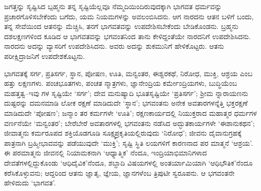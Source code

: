 ಜಗತ್ತನ್ನು ಸೃಷ್ಟಿಸಿದ ಬ್ಪಹ್ಮನು ತನ್ನ ಸೃಷ್ಟಿಯೆಲ್ಲವೂ ನೆಮ್ಮದಿಯಿಂದಿರುವುದಕ್ಕಾಗಿ ಭಾಗವತ ಧರ್ಮವನ್ನು ಪ್ರಚಾರಗೊಳಿಸಬೇಕೆಂದು ಬಗೆದು, ಯಮ ನಿಯಮಗಳನ್ನು ಅವಲಂಬಿಸಿದನು. ಆಗ ನಾರದನು ಆತನ ಬಳಿಗೆ ಬಂದು, ತನ್ನ ಸೇವೆಯಿಂದ ಆತನನ್ನು ಮೆಚ್ಚಿಸಿ, ತನಗೆ ಭಾಗವತವನ್ನು ಉಪದೇಶಿಸಬೇಕೆಂದು ಬೇಡಿಕೊಂಡನು. ಬ್ರಹ್ಮನು ದಶಲಕ್ಷಣಗಳಿಂದ ಕೂಡಿದ ಆ ಭಾಗವತವನ್ನು ಭಗವಂತನಿಂದ ತಾನು ಕೇಳಿದ್ದಂತೆಯೇ ನಾರದನಿಗೆ ಉಪದೇಶಿಸಿದನು. ನಾರದನು ಅದನ್ನು ವ್ಯಾಸರಿಗೆ ಉಪದೇಶಿಸಿದನು. ಅವರು ಅದನ್ನು ಶುಕಮುನಿಗೆ ಹೇಳಿಕೊಟ್ಟರು. ಆತನು ಪರೀಕ್ಷಿದ್ರಾಜನಿಗೆ ಉಪದೇಶಕೊಟ್ಟನು.

ಭಾಗವತಕ್ಕೆ ಸರ್ಗ, ಪ್ರತಿಸರ್ಗ, ಸ್ಥಾನ, ಪೋಷಣ, ಊತಿ, ಮನ್ವಂತರ, ಈಶ್ವರಕಥೆ, ನಿರೋಧ, ಮುಕ್ತಿ, ಆಶ್ರಯ ಎಂಬ ಹತ್ತು ಲಕ್ಷಣಗಳು. ಪಂಚಭೂತಗಳು, ಪಂಚತ ನ್ಮಾತ್ರಗಳು, ಜ್ಞಾನೇಂದ್ರಿಯ ಕರ್ಮೇಂದ್ರಿಯಗಳು, ಬುದ್ಧಿಯೆಂಬ ಮಹತ್ತತ್ವ–ಇವು ಗಳ ಸೃಷ್ಟಿಯೇ ‘ಸರ್ಗ’; ದೇವ ಮನುಷ್ಯಾದಿ ಭೂತಸೃಷ್ಟಿಯೇ ‘ಪ್ರತಿಸರ್ಗ’; ಶ್ರೀಮ ನ್ನಾರಾಯಣನು ದುಷ್ಟರನ್ನು ದಮನಮಾಡಿ ಲೋಕ ರಕ್ಷಣೆ ಮಾಡಿದುದೇ ‘ಸ್ಥಾನ’; ಭಗವಂತನು ಅನೇಕ ಅವತಾರಗಳನ್ನೆತ್ತಿ ಭಕ್ತರಕ್ಷಣೆ ಮಾಡಿದುದೇ ‘ಪೋಷಣ’; ಜನ್ಮಾಂ ತರ ಕರ್ಮಗಳೇ ‘ಊತಿ’; ರಕ್ಷಣಕಾರ್ಯದಲ್ಲಿ ನಿಯುಕ್ತರಾದ ಮಹಾತ್ಮರ ಧರ್ಮಗಳ ವರ್ಣನೆಯೇ ‘ಮನ್ವಂತರ’; ಬೇರೆಬೇರೆ ಅವತಾರಗಳಲ್ಲಿ ಭಗವಂತನು ನಡೆಸಿದ ಅದ್ಭುತಕಾರ್ಯಗಳೇ ‘ಈಶಾನುಕಥನ’; ಜೀವಾತ್ಮನು ಕರ್ಮರೂಪದ ಶಕ್ತಿಯೊಡಗೂಡಿ ಸೂಕ್ಷ್ಮಪ್ರಕೃತಿಯಲ್ಲಿರುವುದು ‘ನಿರೋಧ’; ಜೀವನು ದೈವಾನುಗ್ರಹಕ್ಕೆ ಪಾತ್ರನಾಗಿ ಬ್ರಹ್ಮೀಭಾವವನ್ನು ಪಡೆಯುವುದೇ ‘ಮುಕ್ತಿ’; ಸೃಷ್ಟಿ ಸ್ಥಿತಿ ಲಯಗಳಿಗೆ ಕಾರಣನಾದ ಪರ ಮಾತ್ಮನೆ ‘ಆಶ್ರಯ’. ಈ ಪರಮಾತ್ಮನು ಜೀವನಲ್ಲಿ ನಿಯಾಮಕನಾಗಿ ‘ಆಧ್ಯಾತ್ಮಿಕ’ ನೆಂದೂ, ಇಂದ್ರಿಯಾಭಿಮಾನಿಗಳಾದ ದೇವತೆಗಳಲ್ಲಿದ್ದುಕೊಂಡು ‘ಆಧಿದೈವಿಕ’ನೆಂದೂ, ಶಬ್ದಾದಿ ವಿಷಯಗಳಲ್ಲಿ ಅಂತರ್ಯಾಮಿಯಾಗಿ ‘ಆಧಿಭೌತಿಕ’ನೆಂದೂ ಕರೆಸಿಕೊಳ್ಳುವನು; ಆದ್ದರಿಂದ ಆತನು ಜ್ಞಾತೃ, ಜ್ಞೇಯ, ಜ್ಞಾನಗಳೆಂಬ ತ್ರಿಪುಟೀ ಸ್ವರೂಪನು. ಆ ಭಗವಂತನೇ ಹೇಳಿದುದು ‘ಭಾಗವತ’.

